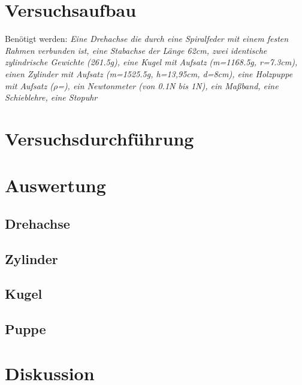 \section{Versuchsaufbau}\justifying

Benötigt werden: \textit{Eine Drehachse die durch eine Spiralfeder mit einem festen Rahmen verbunden ist, eine Stabachse der Länge 62cm, zwei
identische zylindrische Gewichte (261.5g), eine Kugel mit Aufsatz (m=1168.5g, r=7.3cm), einen Zylinder mit Aufsatz (m=1525.5g, h=13,95cm, d=8cm), 
eine Holzpuppe mit Aufsatz ($\rho$=), ein Newtonmeter (von 0.1N bis 1N), ein Ma\ss band, eine Schieblehre, eine Stopuhr}


\section{Versuchsdurchführung}\justifying

\section{Auswertung}\justifying

\subsection{Drehachse}\justifying

\subsection{Zylinder}\justifying

\subsection{Kugel}\justifying

\subsection{Puppe}\justifying

\section{Diskussion}\justifying

\newpage

\printbibliography
